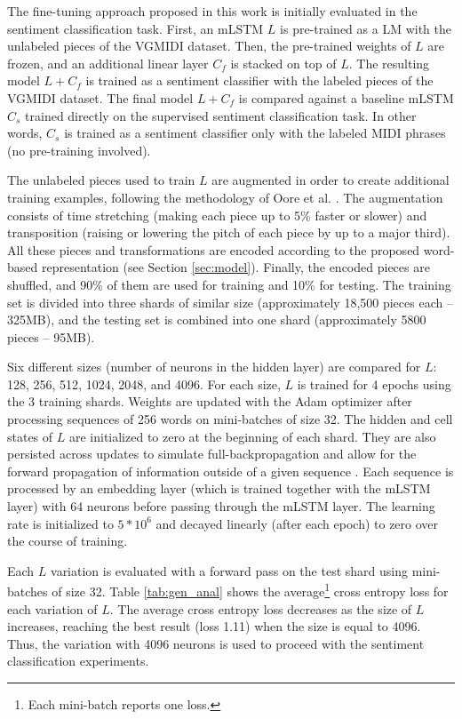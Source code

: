 The fine-tuning approach proposed in this work is initially evaluated in the sentiment classification task. First, an mLSTM $L$ is pre-trained as a LM with the unlabeled pieces of the VGMIDI dataset. Then, the pre-trained weights of $L$ are frozen, and an additional linear layer $C_f$ is stacked on top of $L$. The resulting model $L + C_f$ is trained as a sentiment classifier with the labeled pieces of the VGMIDI dataset. The final model $L + C_f$ is compared against a baseline mLSTM $C_s$ trained directly on the supervised sentiment classification task. In other words, $C_s$ is trained as a sentiment classifier only with the labeled MIDI phrases (no pre-training involved).

The unlabeled pieces used to train $L$ are augmented in order to create additional training examples, following the methodology of Oore et al. \cite{oore2017learning}. The augmentation consists of time stretching (making each piece up to 5\% faster or slower) and transposition (raising or lowering the pitch of each piece by up to a major third). All these pieces and transformations are encoded according to the proposed word-based representation (see Section \ref{sec:model}). Finally, the encoded pieces are shuffled, and 90\% of them are used for training and 10\% for testing. The training set is divided into three shards of similar size (approximately 18,500 pieces each -- 325MB), and the testing set is combined into one shard (approximately 5800 pieces -- 95MB).

Six different sizes (number of neurons in the hidden layer) are compared for $L$: 128, 256, 512, 1024, 2048, and 4096. For each size, $L$ is trained for 4 epochs using the 3 training shards. Weights are updated with the Adam optimizer after processing sequences of 256 words on mini-batches of size 32. The hidden and cell states of $L$ are initialized to zero at the beginning of each shard. They are also persisted across updates to simulate full-backpropagation and allow for the forward propagation of information outside of a given sequence \cite{radford_2017}. Each sequence is processed by an embedding layer (which is trained together with the mLSTM layer) with 64 neurons before passing through the mLSTM layer. The learning rate is initialized to $5*10^6$ and decayed linearly (after each epoch) to zero over the course of training.

Each $L$ variation is evaluated with a forward pass on the test shard using mini-batches of size 32. Table \ref{tab:gen_anal} shows the average\footnote{Each mini-batch reports one loss.} cross entropy loss for each variation of $L$. The average cross entropy loss decreases as the size of $L$ increases, reaching the best result (loss 1.11) when the size is equal to 4096. Thus, the variation with 4096 neurons is used to proceed with the sentiment classification experiments.

